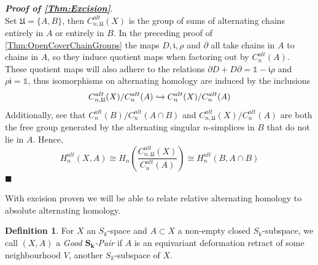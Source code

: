 \documentclass[11pt,a4paper,twoside]{article}
\theoremstyle{plain}
\theoremstyle{definition}
\newtheorem{defn}[thm]{Definition}
\theoremstyle{definition}
\theoremstyle{definition}
\theoremstyle{definition}
\theoremstyle{definition}
\begin{document}
\textbf{\emph{Proof of \ref{Thm:Excision}}}. \\
Set $\mathfrak{U}=\{A,B\}$, then $C_{n,\mathfrak{U}}^{alt}(X)$ is the group of sums of alternating chains entirely in $A$ or entirely in $B$. In the preceding proof of \ref{Thm:OpenCoverChainGroups} the maps $D,\mathfrak{i},\rho$ and $\partial$ all take chains in $A$ to chains in $A$, so they induce quotient maps when factoring out by $C_n^{alt}(A)$. These quotient maps will also adhere to the relations $\partial D+D\partial=\mathbb{1}-\mathfrak{i}\rho$ and $\rho\mathfrak{i}=\mathbb{1}$, thus isomorphisms on alternating homology are induced by the inclusions $$C_{n,\mathfrak{U}}^{alt}(X)/C_n^{alt}(A)\xhookrightarrow{}C_n^{alt}(X)/C_n^{alt}(A)$$
Additionally, see that $C_n^{alt}(B)/C_n^{alt}(A\cap B)$ and $C_{n,\mathfrak{U}}^{alt}(X)/C_n^{alt}(A)$ are both the free group generated by the alternating singular $n$-simplices in $B$ that do not lie in $A$. Hence,
$$H_n^{alt}(X,A)\cong H_n(\frac{C_{n,\mathfrak{U}}^{alt}(X)}{C_n^{alt}(A)})\cong H_n^{alt}(B,A\cap B)$$ 
\hfill$\blacksquare$


With excision proven we will be able to relate relative alternating homology to absolute alternating homology.

\begin{defn}
For $X$ an $S_k$-space and $A\subset X$ a non-empty closed $S_k$-subspace, we call $(X,A)$ a \emph{Good $\mathbf{S_k}$-Pair} if $A$ is an equivariant deformation retract of some neighbourhood $V$, another $S_k$-subspace of $X$.
\end{defn}
\end{document}
